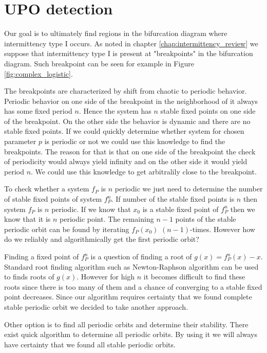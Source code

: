\section{UPO detection}
Our goal is to ultimately find regions in the bifurcation diagram where intermittency type I occurs.
As noted in chapter \ref{chap:intermittency_review} we suppose that intermittency type I is present at "breakpoints" in the bifurcation diagram.
Such breakpoint can be seen for example in Figure \ref{fig:complex_logistic}.
\par
The breakpoints are characterized by shift from chaotic to periodic behavior.
Periodic behavior on one side of the breakpoint in the neighborhood of it always has some fixed period $n$.
Hence the system has $n$ stable fixed points on one side of the breakpoint.
On the other side the behavior is dynamic and there are no stable fixed points.
If we could quickly determine whether system for chosen parameter $p$ is periodic or not we could use this knowledge to find the breakpoints.
The reason for that is that on one side of the breakpoint the check of periodicity would always yield infinity and on the other side it would yield period $n$.
We could use this knowledge to get arbitralily close to the breakpoint.
\par
To check whether a system $f_P$ is $n$ periodic we just need to determine the number of stable fixed points of system $f^{n}_P$.
If number of the stable fixed points is $n$ then system $f_P$ is $n$ periodic.
If we know that $x_0$ is a stable fixed point of $f^{n}_P$ then we know that it is $n$ periodic point.
The remaining $n-1$ points of the stable periodic orbit can be found by iterating $f_P(x_0)$ $(n-1)$-times.
However how do we reliably and algorithmically get the first periodic orbit?
\par
Finding a fixed point of $f^{n}_{P}$ is a question of finding a root of $g(x) = f^{n}_{P}(x) - x$.
Standard root finding algorithm such as Newton-Raphson algorithm can be used to finds roots of $g(x)$.
However for high $n$ it becomes difficult to find these roots since there is too many of them and a chance of converging to a stable fixed point decreases.
Since our algorithm requires certainty that we found complete stable periodic orbit we decided to take another approach.
\par
Other option is to find all periodic orbits and determine their stability.
There exist quick algorithm to determine all periodic orbits.
By using it we will always have certainty that we found all stable periodic orbits.

